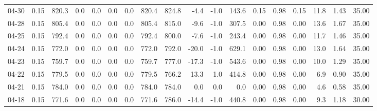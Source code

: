 \begin{threeparttable}
{\begin{tabular}{lrrrrrrrrrrrrrrrrr}
  04-30 &     0.15 & 820.3 &               0.0 &               0.0 &                0.0 &                0.0 & 820.4 & 824.8 &       -4.4 &                     -1.0 &               143.6 &       0.15 &      0.98 &           0.15 &             11.8 &            1.43 &                  35.00 \\
  04-28 &     0.15 & 805.4 &               0.0 &               0.0 &                0.0 &                0.0 & 805.4 & 815.0 &       -9.6 &                     -1.0 &               307.5 &       0.00 &      0.98 &           0.00 &             13.6 &            1.67 &                  35.00 \\
  04-25 &     0.15 & 792.4 &               0.0 &               0.0 &                0.0 &                0.0 & 792.4 & 800.0 &       -7.6 &                     -1.0 &               243.4 &       0.00 &      0.98 &           0.00 &             11.7 &            1.46 &                  35.00 \\
  04-24 &     0.15 & 772.0 &               0.0 &               0.0 &                0.0 &                0.0 & 772.0 & 792.0 &      -20.0 &                     -1.0 &               629.1 &       0.00 &      0.98 &           0.00 &             13.0 &            1.64 &                  35.00 \\
  04-23 &     0.15 & 759.7 &               0.0 &               0.0 &                0.0 &                0.0 & 759.7 & 777.0 &      -17.3 &                     -1.0 &               543.6 &       0.00 &      0.98 &           0.00 &             10.0 &            1.29 &                  35.00 \\
  04-22 &     0.15 & 779.5 &               0.0 &               0.0 &                0.0 &                0.0 & 779.5 & 766.2 &       13.3 &                      1.0 &               414.8 &       0.00 &      0.98 &           0.00 &              6.9 &            0.90 &                  35.00 \\
  04-21 &     0.15 & 784.0 &               0.0 &               0.0 &                0.0 &                0.0 & 784.0 & 784.0 &        0.0 &                      0.0 &                 0.0 &       0.00 &      0.98 &           0.00 &              4.6 &            0.58 &                  35.00 \\
  04-18 &     0.15 & 771.6 &               0.0 &               0.0 &                0.0 &                0.0 & 771.6 & 786.0 &      -14.4 &                     -1.0 &               440.8 &       0.00 &      0.98 &           0.00 &              9.3 &            1.18 &                  30.00 \\

\end{tabular}}
\end{threeparttable}
